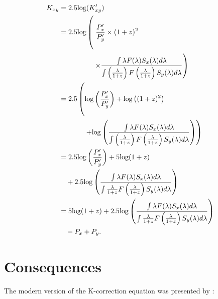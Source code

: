 \begin{equation}
\begin{aligned}
\label{eq:K2k}
  K_{xy} &= 2.5\text{log}(K'_{xy}) \\
         &= 2.5\text{log}
  \begin{aligned}[t]
          &\left( \vphantom{\frac{\int}{\left(\frac{\int}{1}\right)}} \right.
              \frac{P'_x}{P'_y} \times (1 + z)^2 \\
          &\left.\quad \times
              \frac{\int \lambda F(\lambda) S_x(\lambda) d\lambda}
                   {\int \left(\frac{\lambda}{1+z}\right) F\left(\frac{\lambda}{1+z}\right) S_y(\lambda) d\lambda}\right)
  \end{aligned} \\
         &= 2.5
  \begin{aligned}[t]
         &\left( \vphantom{\frac{\int}{\left(\frac{\int}{1}\right)}}
            \text{log} \left( \frac{P'_x}{P'_y} \right)
            + \text{log}\left( {(1 + z)^2}\right) \right. \\
         &\left.\quad + \text{log}\left( \frac{\int \lambda F(\lambda) S_x(\lambda) d\lambda}
                                    {\int \left(\frac{\lambda}{1+z}\right) F\left(\frac{\lambda}{1+z}\right) S_y(\lambda) d\lambda}
            \right) \right)
  \end{aligned} \\
         &= 2.5 \text{log} \left( \frac{P'_x}{P'_y} \right)
            + 5 \text{log} (1 + z) \\
            &\quad + 2.5 \text{log} \left(
              \frac{\int \lambda F(\lambda) S_x(\lambda) d\lambda}
                   {\int \frac{\lambda}{1+z} F\left(\frac{\lambda}{1+z}\right) S_y(\lambda) d\lambda} \right) \\
         &= 5 \text{log} (1 + z)
            + 2.5 \text{log} \left(
              \frac{\int \lambda F(\lambda) S_x(\lambda) d\lambda}
                   {\int \frac{\lambda}{1+z} F\left(\frac{\lambda}{1+z}\right) S_y(\lambda) d\lambda} \right) \\
            &\quad - P_x + P_y .
\end{aligned}
\end{equation}

\section{Consequences}

The modern version of the K-correction equation was presented by \citet{kim1996}:

